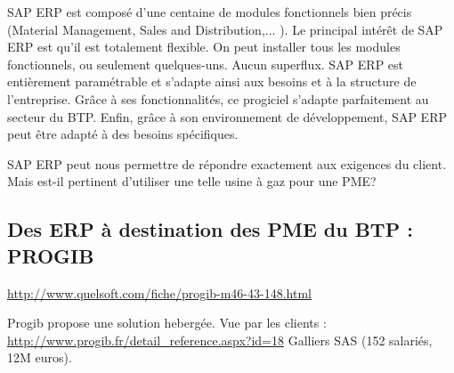 SAP ERP est composé d’une centaine de modules fonctionnels bien précis (Material Management, Sales and Distribution,... ). 
Le principal intérêt de SAP ERP est qu’il est totalement flexible. On peut installer tous les modules fonctionnels, ou seulement quelques-uns. 
Aucun superflux. SAP ERP est entièrement paramétrable et s'adapte ainsi aux besoins et à la structure de l'entreprise. 
Grâce à ses fonctionnalités, ce progiciel s’adapte parfaitement au secteur du BTP. 
Enfin, grâce à son environnement de développement, SAP ERP peut être adapté à des besoins spécifiques.

SAP ERP peut nous permettre de répondre exactement aux exigences du client. Mais est-il pertinent d'utiliser une telle usine à gaz pour une PME?  

\subsection{Des ERP à destination des PME du BTP : PROGIB}
\url{http://www.quelsoft.com/fiche/progib-m46-43-148.html}
 
Progib propose une solution hebergée.
Vue par les clients :
\url{http://www.progib.fr/detail_reference.aspx?id=18}
Galliers SAS (152 salariés, 12M euros).\\

